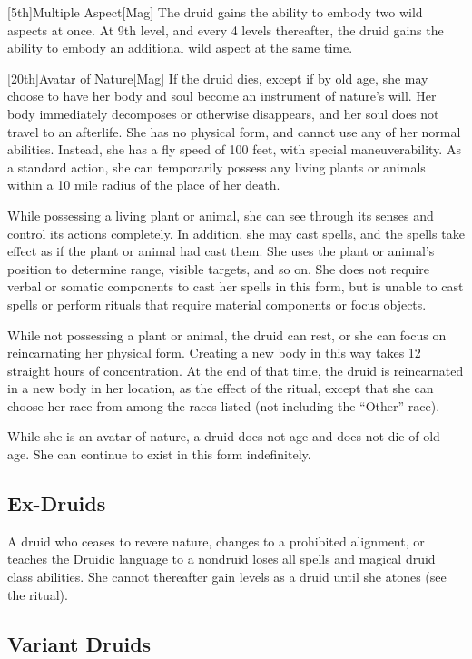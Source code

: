         [5th]{Multiple Aspect}[Mag]
        The druid gains the ability to embody two wild aspects at once.
        At 9th level, and every 4 levels thereafter, the druid gains the ability to embody an additional wild aspect at the same time.

    [20th]{Avatar of Nature}[Mag]
    If the druid dies, except if by old age, she may choose to have her body and soul become an instrument of nature's will.
    Her body immediately decomposes or otherwise disappears, and her soul does not travel to an afterlife.
    She has no physical form, and cannot use any of her normal abilities.
    Instead, she has a fly speed of 100 feet, with special maneuverability.
    As a standard action, she can temporarily possess any living plants or animals within a 10 mile radius of the place of her death.

    While possessing a living plant or animal, she can see through its senses and control its actions completely.
    In addition, she may cast spells, and the spells take effect as if the plant or animal had cast them.
    She uses the plant or animal's position to determine range, visible targets, and so on.
    She does not require verbal or somatic components to cast her spells in this form, but is unable to cast spells or perform rituals that require material components or focus objects.

    While not possessing a plant or animal, the druid can rest, or she can focus on reincarnating her physical form.
    Creating a new body in this way takes 12 straight hours of concentration.
    At the end of that time, the druid is reincarnated in a new body in her location, as the effect of the  ritual, except that she can choose her race from among the races listed (not including the ``Other'' race).

    While she is an avatar of nature, a druid does not age and does not die of old age.
    She can continue to exist in this form indefinitely.

    \subsection{Ex-Druids}
        A druid who ceases to revere nature, changes to a prohibited alignment, or teaches the Druidic language to a nondruid loses all spells and magical druid class abilities.
        She cannot thereafter gain levels as a druid until she atones (see the  ritual).

    \subsection{Variant Druids}

